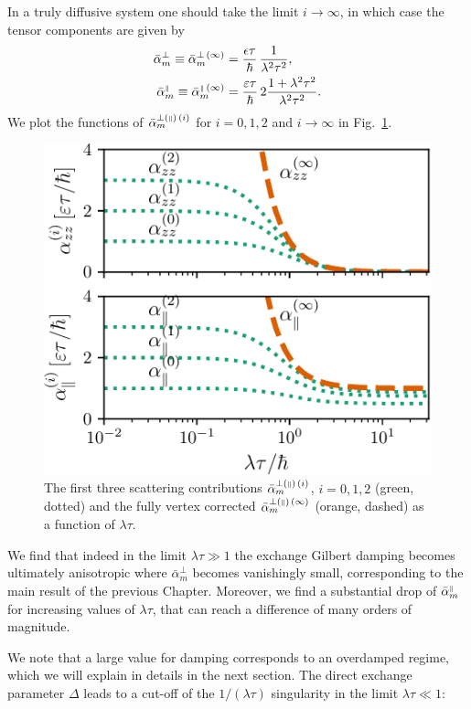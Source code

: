 In a truly diffusive system one should take the limit $i\rightarrow\infty$, in which case the tensor components are given by
\begin{align}
\label{eq:alphaperpzerodelta}
    \bar{\alpha}_{m}^{\perp}\equiv\bar{\alpha}_{m}^{\perp\,(\infty)}  & = \frac{\epsilon \tau}{\hbar}\, \frac{1}{\lambda^2\tau^2},\\
  \label{eq:alphaparallelzerodelta}  \bar{\alpha}_{m}^{{\scriptscriptstyle\parallel}}\equiv\bar{\alpha}_{m}^{{\scriptscriptstyle\parallel}\,(\infty)}  & = \frac{\varepsilon\tau}{\hbar}\,2\frac{1+\lambda^2\tau^2}{\lambda^2\tau^2}.
\end{align}
We plot the functions of $\bar{\alpha}_{m}^{\perp({\scriptscriptstyle\parallel})\,(i)}$ for $i=0,1,2$ and $i\rightarrow\infty$ in Fig.~\ref{fig:alpha_plot}. 
\begin{figure}
    \centering
    \includegraphics[width=0.6\linewidth]{gfx/alpha_plot2}
    \caption{The first three scattering contributions $\bar{\alpha}_{m}^{\perp({\scriptscriptstyle\parallel})\,(i)}$, $i=0,1,2$ (green, dotted) and the fully vertex corrected $\bar{\alpha}_{m}^{\perp({\scriptscriptstyle\parallel})\,(\infty)}$ (orange, dashed) as a function of $\lambda \tau$. }
    \label{fig:alpha_plot}
\end{figure}

We find that indeed in the limit $\lambda\tau\gg1$ the exchange Gilbert damping becomes ultimately anisotropic where $\bar{\alpha}_{m}^{\perp}$ becomes vanishingly small, corresponding to the main result of the previous Chapter. Moreover, we find a substantial drop of $\bar{\alpha}_{m}^{{\scriptscriptstyle\parallel}}$ for increasing values of $\lambda\tau$, that can reach a difference of many orders of magnitude. 

We note that a large value for damping corresponds to an overdamped regime, which we will explain in details in the next section. The direct exchange parameter $\Delta$ leads to a cut-off of the $1/(\lambda\tau)$ singularity in the limit $\lambda\tau\ll1$:

